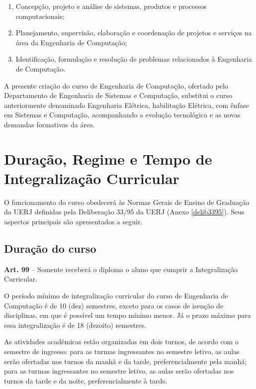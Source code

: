 \begin{enumerate}
  \item Concepção, projeto e análise de sistemas, produtos e processos computacionais;
  \item Planejamento, supervisão, elaboração e coordenação de projetos e serviços na área da Engenharia de Computação;
  \item Identificação, formulação e resolução de problemas relacionados à Engenharia de Computação.
\end{enumerate}

A presente criação do curso de Engenharia de Computação, ofertado pelo Departamento de Engenharia de Sistemas e Computação, substitui o curso anteriormente denominado Engenharia Elétrica, habilitação Elétrica, com ênfase em Sistemas e Computação, acompanhando a evolução tecnológica e as novas demandas formativas da área.

\section{Duração, Regime e Tempo de Integralização Curricular}

O funcionamento do curso obedecerá às Normas Gerais de Ensino de Graduação da UERJ definidas pela Deliberação  33/95 da UERJ (Anexo \ref{delib3395}). Seus aspectos principais são apresentados a seguir.

\subsection{Duração do curso}
\label{sec:integralizacao}
\begin{itquotation}
  \textbf{Art. 99} -- Somente receberá o diploma o aluno que cumprir a Integralização Curricular.
\end{itquotation}

O período mínimo de integralização curricular do curso de Engenharia de Computação  é de 10 (dez) semestres, exceto para os casos de isenção de disciplinas, em que é possível um tempo mínimo menor. Já o prazo máximo para essa integralização é de 18 (dezoito) semestres.

As atividades acadêmicas estão organizadas em dois turnos, de acordo com o semestre de ingresso: para as turmas ingressantes no  semestre letivo, as aulas serão ofertadas nos turnos da manhã e da tarde, preferencialmente pela manhã; para as turmas ingressantes no  semestre letivo, as aulas serão ofertadas nos turnos da tarde e da noite, preferencialmente à tarde.

